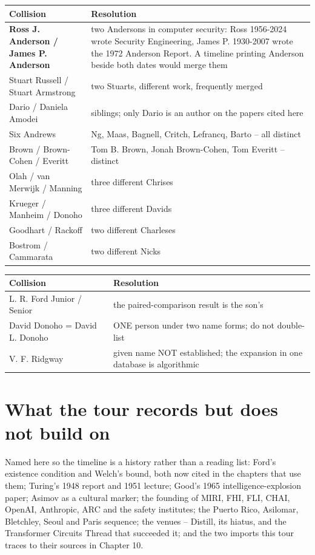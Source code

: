\noindent
\begin{tabularx}{\textwidth}{XX}
\toprule
Collision & Resolution \\
\midrule
\textbf{Ross J. Anderson / James P. Anderson} & two Andersons in computer security: Ross 1956-2024 wrote Security Engineering, James P. 1930-2007 wrote the 1972 Anderson Report. A timeline printing Anderson beside both dates would merge them \\
Stuart Russell / Stuart Armstrong & two Stuarts, different work, frequently merged \\
Dario / Daniela Amodei & siblings; only Dario is an author on the papers cited here \\
Six Andrews & Ng, Maas, Bagnell, Critch, Lefrancq, Barto -- all distinct \\
Brown / Brown-Cohen / Everitt & Tom B. Brown, Jonah Brown-Cohen, Tom Everitt -- distinct \\
Olah / van Merwijk / Manning & three different Chrises \\
Krueger / Manheim / Donoho & three different Davids \\
Goodhart / Rackoff & two different Charleses \\
Bostrom / Cammarata & two different Nicks \\
\bottomrule
\end{tabularx}
\par\medskip
\noindent
\begin{tabularx}{\textwidth}{XX}
\toprule
Collision & Resolution \\
\midrule
L. R. Ford Junior / Senior & the paired-comparison result is the son's \\
David Donoho = David L. Donoho & ONE person under two name forms; do not double-list \\
V. F. Ridgway & given name NOT established; the expansion in one database is algorithmic \\
\bottomrule
\end{tabularx}
\par\medskip

\section*{What the tour records but does not build on}

Named here so the timeline is a history rather than a reading list: Ford's existence condition and Welch's bound, both now cited in the chapters that use them; Turing's 1948 report and 1951 lecture; Good's 1965 intelligence-explosion paper; Asimov as a cultural marker; the founding of MIRI, FHI, FLI, CHAI, OpenAI, Anthropic, ARC and the safety institutes; the Puerto Rico, Asilomar, Bletchley, Seoul and Paris sequence; the venues -- Distill, its hiatus, and the Transformer Circuits Thread that succeeded it; and the two imports this tour traces to their sources in Chapter 10.

